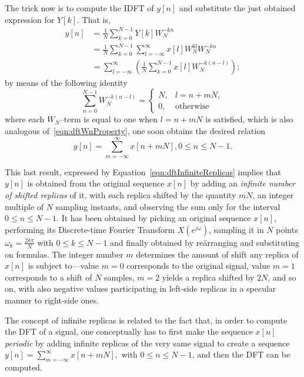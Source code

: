 \documentclass[\documentfontsize, twocolumn]{\classname}
\begin{document}
The trick now is to compute the IDFT of $y[n]$ and substitute the just obtained expression for $Y[k]$. That is,
\begin{align*}
    y[n]
    &= \frac 1 N \sum_{k=0}^{N-1} Y[k] W_N^{-kn}\\
    &= \frac 1 N \sum_{k=0}^{N-1}\sum_{l=-\infty}^\infty x[l]W_N^{kl} W_N^{-kn}\\
    &= \sum_{l=-\infty}^\infty\left(\frac 1 N \sum_{k=0}^{N-1} x[l]W_N^{-k(n-l)}\right);
\end{align*}
by means of the following identity
\begin{equation}\label{eqn:dftWnPropertyTwo}
    \sum_{n=0}^{N-1}W_N^{-k(n-l)} = \left\{\begin{array}{ll} N, & l = n + mN, \\ 0, & \mbox{otherwise}\end{array}\right.
\end{equation}
where each $W_N$--term is equal to one when $l = n + mN$ is satisfied, which is also analogous of~\ref{eqn:dftWnProperty}, one soon obtains the desired relation
\begin{equation}\label{eqn:dftInfiniteReplicas}
    y[n] = \sum_{m=-\infty}^{\infty} x[n + mN], 0 \leq n \leq N-1.
\end{equation}

This last result, expressed by Equation~\ref{eqn:dftInfiniteReplicas} implies that $y[n]$ is obtained from the original sequence $x[n]$ by adding an \emph{infinite number of shifted replicas} of it, with each replica shifted by the quantity $mN$, an integer multiple of $N$ sampling instants, and observing the sum only for the interval $0 \leq n \leq N-1$. It has been obtained by picking an original sequence $x[n]$, performing its Discrete-time Fourier Transform $X(e^{j\omega})$, sampling it in $N$ points $\omega_k = \frac{2k\pi}{N}$ with $0 \leq k \leq N-1$ and finally obtained by re\"arranging and substituting on formulas. The integer number $m$ determines the amount of shift any replica of $x[n]$ is subject to---value $m=0$ corresponds to the original signal, value $m=1$ corresponds to a shift of $N$ samples, $m=2$ yields a replica shifted by $2N$, and so on, with also negative values participating in left-side replicas in a specular manner to right-side ones.

The concept of infinite replicas is related to the fact that, in order to compute the DFT of a signal, one conceptually has to first make the sequence $x[n]$ \emph{periodic} by adding infinite replicas of the very same signal to create a sequence $y[n] = \sum_{m=-\infty}^{\infty} x[n + mN],$ with $0 \leq n \leq N-1$, and then the DFT can be computed.
\end{document}
